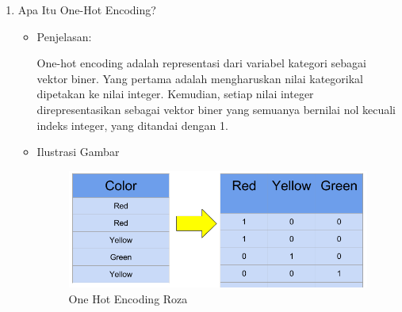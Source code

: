 \begin{enumerate}
\item Apa Itu One-Hot Encoding?
\begin{itemize}
\item Penjelasan:
\par One-hot encoding adalah representasi dari variabel kategori sebagai vektor biner. Yang pertama adalah  mengharuskan nilai kategorikal dipetakan ke nilai integer. Kemudian, setiap nilai integer direpresentasikan sebagai vektor biner yang semuanya bernilai nol kecuali indeks integer, yang ditandai dengan 1.
\par
\item Ilustrasi Gambar
\begin{figure}[!hbtp]
\centering
\includegraphics[scale=0.5]{figures/onehotroza.png}
\caption{One Hot Encoding Roza}
\label{bag-fadila}
\end{figure}
\par
\end{itemize}
\par
\par


\end{enumerate}
